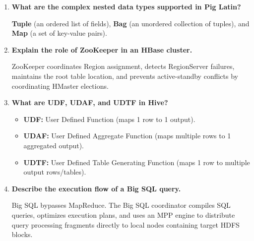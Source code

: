 \documentclass[12pt,a4paper]{article}
\newcommand{\Q}[1]{\textbf{#1}\par\noindent\ignorespaces}
\begin{document}
\begin{tcolorbox}[exambox, title={\textbf{Frequently Asked / Viva Questions}}]
\begin{enumerate}[leftmargin=*, topsep=0pt, label=\textbf{Q\arabic*.}, itemsep=5pt]
  \item \Q{What are the complex nested data types supported in Pig Latin?}
        \textbf{Tuple} (an ordered list of fields), \textbf{Bag} (an unordered collection of tuples), and \textbf{Map} (a set of key-value pairs).
        
  \item \Q{Explain the role of ZooKeeper in an HBase cluster.}
        ZooKeeper coordinates Region assignment, detects RegionServer failures, maintains the root table location, and prevents active-standby conflicts by coordinating HMaster elections.
        
  \item \Q{What are UDF, UDAF, and UDTF in Hive?}
        \begin{itemize}[leftmargin=*, noitemsep]
          \item \textbf{UDF:} User Defined Function (maps 1 row to 1 output).
          \item \textbf{UDAF:} User Defined Aggregate Function (maps multiple rows to 1 aggregated output).
          \item \textbf{UDTF:} User Defined Table Generating Function (maps 1 row to multiple output rows/tables).
        \end{itemize}
        
  \item \Q{Describe the execution flow of a Big SQL query.}
        Big SQL bypasses MapReduce. The Big SQL coordinator compiles SQL queries, optimizes execution plans, and uses an MPP engine to distribute query processing fragments directly to local nodes containing target HDFS blocks.
\end{enumerate}
\end{tcolorbox}

\vspace{6pt}
\end{document}
